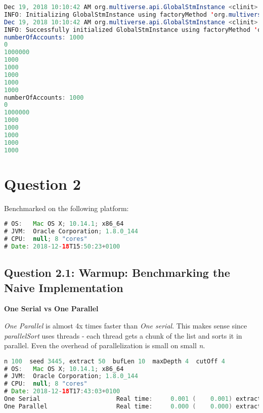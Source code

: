 \documentclass[format=acmsmall, review=false, screen=true]{acmart}
\begin{document}
\begin{lstlisting}[language=java]
Dec 19, 2018 10:10:42 AM org.multiverse.api.GlobalStmInstance <clinit>
INFO: Initializing GlobalStmInstance using factoryMethod 'org.multiverse.stms.gamma.GammaStm.createFast'.
Dec 19, 2018 10:10:42 AM org.multiverse.api.GlobalStmInstance <clinit>
INFO: Successfully initialized GlobalStmInstance using factoryMethod 'org.multiverse.stms.gamma.GammaStm.createFast'.
numberOfAccounts: 1000
0
1000000
1000
1000
1000
1000
1000
numberOfAccounts: 1000
0
1000000
1000
1000
1000
1000
1000
\end{lstlisting}


\section{Question 2}

Benchmarked on the following platform:

\begin{lstlisting}[language=java]
# OS:   Mac OS X; 10.14.1; x86_64
# JVM:  Oracle Corporation; 1.8.0_144
# CPU:  null; 8 "cores"
# Date: 2018-12-18T15:50:23+0100
\end{lstlisting}

\subsection{Question 2.1: Warmup: Benchmarking the Naive Implementation}


\textbf{One Serial vs One Parallel}

\emph{One Parallel} is almost 4x times faster than \emph{One serial}. This makes sense since \emph{parallelSort} uses threads - each thread gets a chunk of the list and sorts it in parallel. Even the overhead of parallelization is small on small \emph{n}.

\begin{lstlisting}[language=java]
n 100  seed 3445, extract 50  bufLen 10  maxDepth 4  cutOff 4
# OS:   Mac OS X; 10.14.1; x86_64
# JVM:  Oracle Corporation; 1.8.0_144
# CPU:  null; 8 "cores"
# Date: 2018-12-18T17:43:03+0100
One Serial                     Real time:     0.001 (    0.001) extract:    50
One Parallel                   Real time:     0.000 (    0.000) extract:    50
\end{lstlisting}
\end{document}
